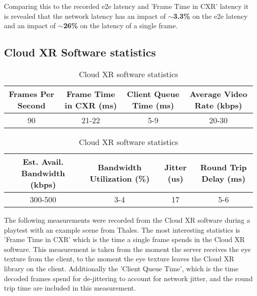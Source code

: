 Comparing this to the recorded \acrshort{e2e} latency and 'Frame Time in CXR' latency it is revealed that the network latency has an impact of \textbf{$\sim$3.3\%} on the \acrshort{e2e} latency and an impact of \textbf{$\sim$26\%} on the latency of a single frame.

\newpage

\subsection{Cloud XR Software statistics}
\label{sec:res:t3}
\begin{table}[h!]
\begin{center}
\caption{Cloud XR software statistics}
\begin{tabular}{|c|c|c|c|}
\hline
Frames Per Second & Frame Time in CXR (\acrshort{ms}) & Client Queue Time (\acrshort{ms}) & Average Video Rate (kbps)  \\ \hline
90 & 21-22 & 5-9 & 20-30 \\ \hline
\end{tabular}
\begin{tabular}{|c|c|c|c|}
\hline
Est. Avail. Bandwidth (kbps) & Bandwidth Utilization (\%) & Jitter (\acrshort{us}) & Round Trip Delay (\acrshort{ms}) \\ \hline
300-500 & 3-4 & 17 & 5-6 \\ \hline
\end{tabular}
\end{center}
\end{table}

The following measurements were recorded from the Cloud XR software during a playtest with an example scene from Thales. The most interesting statistics is 'Frame Time in CXR' which is the time a single frame spends in the Cloud XR software. This measurement is taken from the moment the server receives the eye texture from the client, to the moment the eye texture leaves the Cloud XR library on the client. Additionally the 'Client Queue Time', which is the time decoded frames spend for de-jittering to account for network  jitter, and the round trip time are included in this measurement.